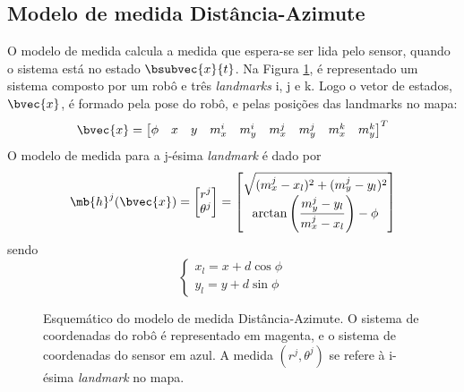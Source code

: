 \subsection{Modelo de medida Distância-Azimute}
O modelo de medida calcula a medida que espera-se ser lida pelo sensor, quando o sistema está no estado $\bsubvec{x}{t}$. Na Figura \ref{fig:range-bearing-measurement-schematic}, é representado um sistema composto por um robô e três \textit{landmarks} i, j e k. Logo o vetor de estados, $\bvec{x}$, é formado pela pose do robô, e pelas posições das landmarks no mapa:
\begin{equation}
  \bvec{x} = \begin{bmatrix}
    \phi & x & y & m_x^i & m_y^i & m_x^j & m_y^j & m_x^k & m_y^k
  \end{bmatrix}^T
\end{equation}
O modelo de medida para a j-ésima \textit{landmark} é dado por
\renewcommand{\arraystretch}{1.5}
\begin{equation}
  \mb{h}^j(\bvec{x}) = \begin{bmatrix}
    r^j \\ \theta^j
  \end{bmatrix} = \begin{bmatrix}
    \sqrt{(m_x^j - x_l)^2 + (m_y^j - y_l)^2} \\
    \arctan\left(\dfrac{m_y^j - y_l}{m_x^j - x_l}\right) - \phi
  \end{bmatrix}
  \label{eq:range-bearing-measurement-model}
\end{equation}
\renewcommand{\arraystretch}{1}
sendo
\begin{equation}
  \begin{cases}
    x_l = x + d \cos \phi\\
    y_l = y + d \sin \phi
  \end{cases}
\end{equation}

\begin{figure}[h]
  \centering
  
  \caption{Esquemático do modelo de medida Distância-Azimute. O sistema de coordenadas do robô é representado em magenta, e o sistema de coordenadas do sensor em azul. A medida $(r^j, \theta^j)$ se refere à i-ésima \textit{landmark} no mapa.}
  \label{fig:range-bearing-measurement-schematic}
\end{figure}

